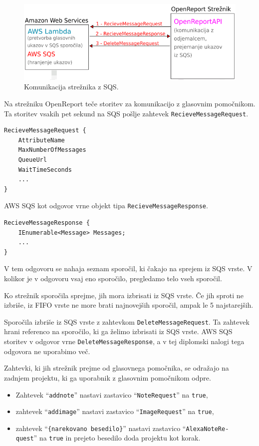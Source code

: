 \documentclass[a4paper, 12pt]{book}
\begin{document}
\begin{figure}[H]
\begin{center}
\includegraphics[width=13cm]{plan_sqs_server}
\end{center}
\caption{Komunikacija strežnika z SQS.}
\label{plan_sqs_server}
\end{figure}

Na strežniku OpenReport teče storitev za komunikacijo z glasovnim pomočnikom.
Ta storitev vsakih pet sekund na SQS pošlje zahtevek \texttt{RecieveMessageRequest}.

\begin{Verbatim}[commandchars=+\[\]]
RecieveMessageRequest {
    AttributeName 
    MaxNumberOfMessages 
    QueueUrl 
    WaitTimeSeconds
    ... 
} 
\end{Verbatim}

AWS SQS kot odgovor vrne objekt tipa \texttt{RecieveMessageResponse}.

\begin{Verbatim}[commandchars=+\[\]]
RecieveMessageResponse {
    IEnumerable<Message> Messages;
    ...
}
\end{Verbatim}

V tem odgovoru se nahaja seznam sporočil, ki čakajo na sprejem iz SQS vrste.
V kolikor je v odgovoru vsaj eno sporočilo, pregledamo telo vseh sporočil. 

Ko strežnik sporočila sprejme, jih mora izbrisati iz SQS vrste.
Če jih sproti ne izbriše, iz FIFO vrste ne more brati najnovejših sporočil, ampak le 5 najstarejših.

Sporočila izbriše iz SQS vrste z zahtevkom \texttt{DeleteMessageRequest}.
Ta zahtevek hrani referenco na sporočilo, ki ga želimo izbrisati iz SQS vrste.
AWS SQS storitev v odgovor vrne \texttt{DeleteMessageResponse}, a v tej diplomski nalogi tega odgovora ne uporabimo več.

Zahtevki, ki jih strežnik prejme od glasovnega pomočnika, se odražajo na zadnjem projektu, ki ga uporabnik z glasovnim pomočnikom odpre.
\begin{itemize}
	\item Zahtevek \enquote{\texttt{addnote}} nastavi zastavico \enquote{\texttt{NoteRequest}} na \texttt{true},
	\item zahtevek \enquote{\texttt{addimage}} nastavi zastavico \enquote{\texttt{ImageRequest}} na \texttt{true},
	\item zahtevek \enquote{\texttt{\{narekovano besedilo\}}} nastavi zastavico \enquote{\texttt{AlexaNoteRe-\\quest}} na \texttt{true} in prejeto besedilo doda projektu kot korak.
\end{itemize}
\end{document}

